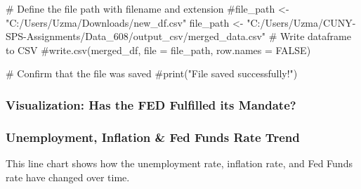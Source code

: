 \documentclass[
  letterpaper,
  DIV=11,
  numbers=noendperiod]{scrartcl}
\newenvironment{Shaded}{\begin{snugshade}}{\end{snugshade}}
\newcommand{\CommentTok}[1]{\textcolor[rgb]{0.37,0.37,0.37}{#1}}
\newcommand{\NormalTok}[1]{\textcolor[rgb]{0.00,0.23,0.31}{#1}}
\newcommand{\OtherTok}[1]{\textcolor[rgb]{0.00,0.23,0.31}{#1}}
\newcommand{\StringTok}[1]{\textcolor[rgb]{0.13,0.47,0.30}{#1}}
\begin{document}
\begin{Shaded}
\begin{Highlighting}[]
\CommentTok{\# Define the file path with filename and extension}
\CommentTok{\#file\_path \textless{}{-} "C:/Users/Uzma/Downloads/new\_df.csv"}
\NormalTok{file\_path }\OtherTok{\textless{}{-}} \StringTok{"C:/Users/Uzma/CUNY{-}SPS{-}Assignments/Data\_608/output\_csv/merged\_data.csv"}
\CommentTok{\# Write dataframe to CSV}
\CommentTok{\#write.csv(merged\_df, file = file\_path, row.names = FALSE)}

\CommentTok{\# Confirm that the file was saved}
\CommentTok{\#print("File saved successfully!")}
\end{Highlighting}
\end{Shaded}

\subsubsection{Visualization: Has the FED Fulfilled its
Mandate?}\label{visualization-has-the-fed-fulfilled-its-mandate}

\subsubsection{Unemployment, Inflation \& Fed Funds Rate
Trend}\label{unemployment-inflation-fed-funds-rate-trend}

This line chart shows how the unemployment rate, inflation rate, and Fed
Funds rate have changed over time.
\end{document}
